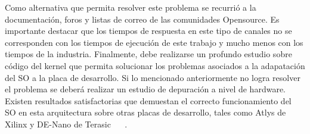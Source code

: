 		Como alternativa que permita resolver este problema se recurrió a la documentación, foros y listas de correo de las comunidades Opensource. Es importante
		destacar que los tiempos de respuesta en este tipo de canales no se corresponden con los tiempos de ejecución de este trabajo y mucho menos con los
		tiempos de la industria. Finalmente, debe realizarse un profundo estudio sobre código del kernel que permita solucionar los problemas asociados a
		la adapatación del SO a la placa de desarrollo. Si lo mencionado anteriormente no logra resolver el problema se deberá realizar un estudio de
		depuración a nivel de hardware. Existen resultados satisfactorias que demuestan el correcto funcionamiento del SO en esta arquitectura sobre otras
		placas de desarrollo, tales como Atlys de Xilinx y DE-Nano de Terasic ~\cite{rte.se} ~\cite{denano}.
		
		